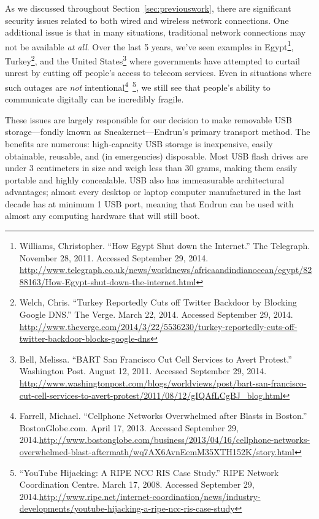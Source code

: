 \documentclass[12pt]{article}
\begin{document}
  As we discussed throughout Section~\ref{sec:previouswork}, there are significant security issues related to both wired and wireless network connections. One additional issue is that in many situations, traditional network connections may not be available \textit{at all}. Over the last 5 years, we've seen examples in Egypt\footnote{Williams, Christopher. ``How Egypt Shut down the Internet.'' The Telegraph. November 28, 2011. Accessed September 29, 2014. \url{http://www.telegraph.co.uk/news/worldnews/africaandindianocean/egypt/8288163/How-Egypt-shut-down-the-internet.html}}, Turkey\footnote{Welch, Chris. ``Turkey Reportedly Cuts off Twitter Backdoor by Blocking Google DNS.'' The Verge. March 22, 2014. Accessed September 29, 2014. \url{http://www.theverge.com/2014/3/22/5536230/turkey-reportedly-cuts-off-twitter-backdoor-blocks-google-dns}}, and the United States\footnote{Bell, Melissa. ``BART San Francisco Cut Cell Services to Avert Protest.'' Washington Post. August 12, 2011. Accessed September 29, 2014. \url{http://www.washingtonpost.com/blogs/worldviews/post/bart-san-francisco-cut-cell-services-to-avert-protest/2011/08/12/gIQAfLCgBJ_blog.html}} where governments have attempted to curtail unrest by cutting off people's access to telecom services. Even in situations where such outages are \textit{not} intentional\footnote{Farrell, Michael. ``Cellphone Networks Overwhelmed after Blasts in Boston.'' BostonGlobe.com. April 17, 2013. Accessed September 29, 2014.\url{http://www.bostonglobe.com/business/2013/04/16/cellphone-networks-overwhelmed-blast-aftermath/wq7AX6AvnEemM35XTH152K/story.html}}~\footnote{``YouTube Hijacking: A RIPE NCC RIS Case Study.'' RIPE Network Coordination Centre. March 17, 2008. Accessed September 29, 2014.\url{http://www.ripe.net/internet-coordination/news/industry-developments/youtube-hijacking-a-ripe-ncc-ris-case-study}}, we still see that people's ability to communicate digitally can be incredibly fragile.
  
  These issues are largely responsible for our decision to make removable USB storage---fondly known as Sneakernet---Endrun's primary transport method. The benefits are numerous: high-capacity USB storage is inexpensive, easily obtainable, reusable, and (in emergencies) disposable. Most USB flash drives are under 3 centimeters in size and weigh less than 30 grams, making them easily portable and highly concealable. USB also has immeasurable architectural advantages; almost every desktop or laptop computer manufactured in the last decade has at minimum 1 USB port, meaning that Endrun can be used with almost any computing hardware that will still boot.
  
\end{document}
